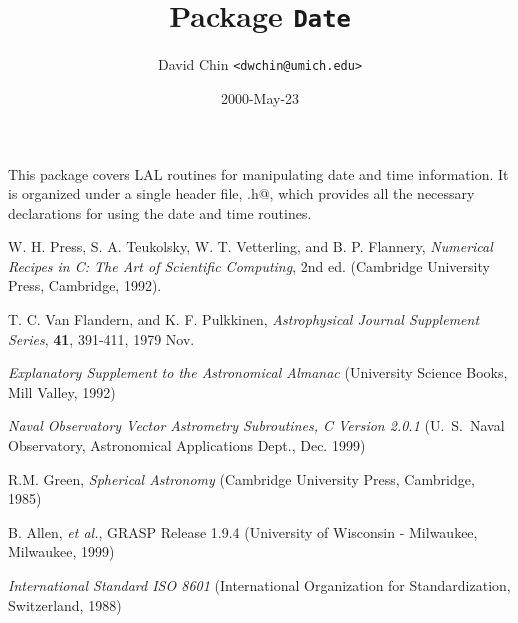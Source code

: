 \documentclass{article}
\begin{document}
\title{Package \texttt{Date}}
\author{David Chin \texttt{<dwchin@umich.edu>}}
\date{2000-May-23}
\maketitle

This package covers LAL routines for manipulating date and time
information.  It is organized under a single header file, \verb@Date.h@,
which provides all the necessary declarations for using the date and time
routines. 















\begin{thebibliography}{0}
  W. H. Press, S. A. Teukolsky, W. T. Vetterling, and B. P. Flannery,
  \textit{Numerical Recipes in C: The Art of Scientific Computing}, 2nd ed.
  (Cambridge University Press, Cambridge, 1992).

  T. C. Van Flandern, and K. F. Pulkkinen, 
  \textit{Astrophysical Journal  Supplement Series}, \textbf{41},
  391-411, 1979 Nov.
  
  \textit{Explanatory Supplement to the Astronomical Almanac} (University
  Science Books, Mill Valley, 1992)

  \textit{Naval Observatory Vector Astrometry Subroutines, C Version 2.0.1}
(U.~S.~Naval Observatory, Astronomical Applications Dept., Dec. 1999)
  
  R.M. Green, \textit{Spherical Astronomy} (Cambridge University Press,
  Cambridge, 1985)
  
  B. Allen, \textit{et al.}, GRASP Release 1.9.4 (University of Wisconsin
  - Milwaukee, Milwaukee, 1999)
  
  \textit{International Standard ISO 8601} (International Organization for
  Standardization, Switzerland, 1988)
  
\end{thebibliography}
\end{document}
